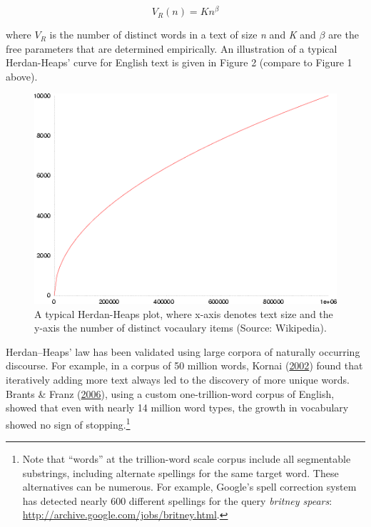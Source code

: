 \documentclass[
]{article}
\begin{document}
\[
V_{R}(n)=Kn^{\beta }
\]

where \(V_{R}\) is the number of distinct words in a text of size
\emph{n} and \emph{K} and \(\beta\) are the free parameters that are
determined empirically. An illustration of a typical Herdan-Heaps' curve
for English text is given in Figure 2 (compare to Figure 1 above).

\begin{figure}

{\centering \includegraphics[width=0.8\linewidth]{figures/Heaps_law_plot} 

}

\caption{A typical Herdan-Heaps plot, where x-axis denotes text size and the y-axis the number of distinct vocaulary items (Source: Wikipedia).}\label{fig:heaps}
\end{figure}

Herdan--Heaps' law has been validated using large corpora of naturally
occurring discourse. For example, in a corpus of 50 million words,
Kornai (\protect\hyperlink{ref-Kornai2002}{2002}) found that iteratively
adding more text always led to the discovery of more unique words.
Brants \& Franz (\protect\hyperlink{ref-BrantsFranz2006}{2006}), using a
custom one-trillion-word corpus of English, showed that even with nearly
14 million word types, the growth in vocabulary showed no sign of
stopping.\footnote{Note that ``words'' at the trillion-word scale corpus
  include all segmentable substrings, including alternate spellings for
  the same target word. These alternatives can be numerous. For example,
  Google's spell correction system has detected nearly 600 different
  spellings for the query \emph{britney spears}:
  \url{http://archive.google.com/jobs/britney.html}.}
\end{document}
